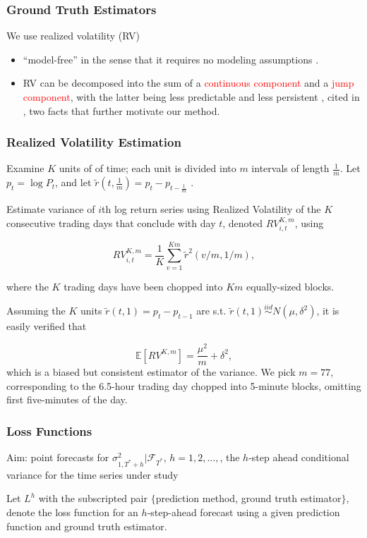\documentclass[9pt]{beamer}
\newcommand{\simiid}{\stackrel{iid}{\sim}} %
\def\E{\mathbb{E}} %
\theoremstyle{definition}
\begin{document}
\begin{frame}
\frametitle{Ground Truth Estimators}

We use realized volatility (RV)
\begin{itemize}
\item ``model-free'' in the sense that it requires no modeling assumptions \parencite[][]{andersen2010stochastic}.  
\item RV can be decomposed into the sum of a \textcolor{red}{continuous component} and a \textcolor{red}{jump component}, with the latter being less predictable and less persistent \parencite[][]{andersen2007roughing}, cited in \cite[][]{de2006forecasting}, two facts that further motivate our method.
\end{itemize}

\end{frame}

\begin{frame}
    \frametitle{Realized Volatility Estimation}

Examine $K$ units of of time; each unit is divided into $m$ intervals of length $\frac{1}{m}$.  Let $p_{t} = \log{P_{t}}$, and let $\tilde{r}(t,\frac{1}{m}) = p_{t} - p_{t-\frac{1}{m}}$  \parencite[][]{andersen2008realized}. 

\bigbreak

Estimate variance of $i$th log return series using Realized Volatility of the $K$ consecutive trading days that conclude with day $t$, denoted $RV_{i,t}^{K,m}$, using

$$RV_{i,t}^{K,m} = \frac{1}{K}\sum^{Km}_{v=1}\tilde{r}^{2}(v/m,1/m),$$

where the $K$ trading days have been chopped into $Km$ equally-sized blocks.

Assuming the $K$ units $\tilde{r}(t, 1) = p_{t} - p_{t-1}$ are s.t. $\tilde{r}(t, 1) \simiid N(\mu, \delta^{2})$, it is easily verified that 

$$\E[RV^{K,m}] = \frac{\mu^{2}}{m} + \delta^{2},$$
which is a biased but consistent estimator of the variance.  We pick $m = 77$, corresponding to the 6.5-hour trading day chopped into 5-minute blocks, omitting first five-minutes of the day.

\end{frame}

\begin{frame}
\frametitle{Loss Functions}

Aim: point forecasts for $\sigma^{2}_{1,T^{*}+h}|\mathcal{F}_{T^{*}}$, $h=1,2,...,$, the $h$-step ahead conditional variance for the time series under study\\

\bigbreak
 
Let $L^{h}$ with the subscripted pair $\{$prediction method, ground truth estimator$\}$, denote the loss function for an $h$-step-ahead forecast using a given prediction function and ground truth estimator.  

\end{frame}
\end{document}
